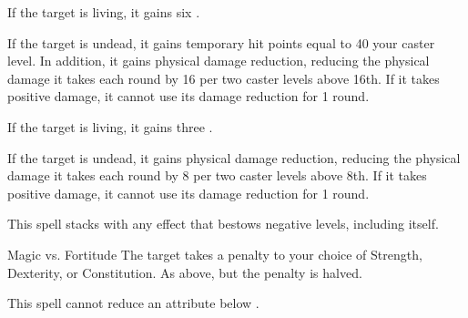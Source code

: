 \begin{spellheader}
    \spellrng{\rngclose}
    \spelldur{\durshort}
\end{spellheader}
\begin{spelleffects}
    \spelleffect If the target is living, it gains six \negativelevels.

    \spelleffect If the target is undead, it gains temporary hit points equal to 40 \add your caster level. In addition, it gains physical damage reduction, reducing the physical damage it takes each round by 16  per two caster levels above 16th. If it takes positive damage, it cannot use its damage reduction for 1 round.
\end{spelleffects}
\begin{spellfooter}

\end{spellfooter}

\begin{spellheader}
    \spellrng{\rngclose}
    \spelldur{\durshort}
\end{spellheader}
\begin{spelleffects}
    \spelleffect If the target is living, it gains three \negativelevels.

    If the target is undead, it gains physical damage reduction, reducing the physical damage it takes each round by 8  per two caster levels above 8th. If it takes positive damage, it cannot use its damage reduction for 1 round.
\end{spelleffects}
\begin{spellfooter}
    \spellnotes This spell stacks with any effect that bestows negative levels, including itself.
\end{spellfooter}

\begin{spellheader}
    \spellrng{\rngmed}
    \spelldur{\durshort}
\end{spellheader}
\begin{spelleffects}
    \begin{spellattack}{Magic vs. Fortitude}
        \spellsuccess The target takes a  penalty to your choice of Strength, Dexterity, or Constitution.
        \spellfailure As above, but the penalty is halved.
    \end{spellattack}
\end{spelleffects}
\begin{spellfooter}
    \spellnotes This spell cannot reduce an attribute below .
\end{spellfooter}

